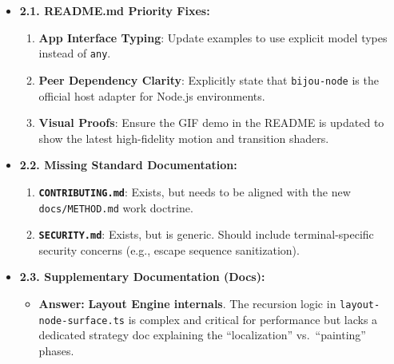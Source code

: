 \begin{itemize}
\tightlist
\item
  \textbf{2.1. README.md Priority Fixes:}

  \begin{enumerate}
  \def\labelenumi{\arabic{enumi}.}
  \tightlist
  \item
    \textbf{App Interface Typing}: Update examples to use explicit model types instead of \texttt{a\allowbreak{}n\allowbreak{}y}.
  \item
    \textbf{Peer Dependency Clarity}: Explicitly state that \texttt{b\allowbreak{}i\allowbreak{}j\allowbreak{}o\allowbreak{}u\allowbreak{}-\allowbreak{}n\allowbreak{}o\allowbreak{}d\allowbreak{}e} is the official host adapter for Node.js environments.
  \item
    \textbf{Visual Proofs}: Ensure the GIF demo in the README is updated to show the latest high-fidelity motion and transition shaders.
  \end{enumerate}
\item
  \textbf{2.2. Missing Standard Documentation:}

  \begin{enumerate}
  \def\labelenumi{\arabic{enumi}.}
  \tightlist
  \item
    \textbf{\texttt{C\allowbreak{}O\allowbreak{}N\allowbreak{}T\allowbreak{}R\allowbreak{}I\allowbreak{}B\allowbreak{}U\allowbreak{}T\allowbreak{}I\allowbreak{}N\allowbreak{}G\allowbreak{}.\allowbreak{}m\allowbreak{}d}}: Exists, but needs to be aligned with the new \texttt{d\allowbreak{}o\allowbreak{}c\allowbreak{}s\allowbreak{}/\allowbreak{}M\allowbreak{}E\allowbreak{}T\allowbreak{}H\allowbreak{}O\allowbreak{}D\allowbreak{}.\allowbreak{}m\allowbreak{}d} work doctrine.
  \item
    \textbf{\texttt{S\allowbreak{}E\allowbreak{}C\allowbreak{}U\allowbreak{}R\allowbreak{}I\allowbreak{}T\allowbreak{}Y\allowbreak{}.\allowbreak{}m\allowbreak{}d}}: Exists, but is generic. Should include terminal-specific security concerns (e.g., escape sequence sanitization).
  \end{enumerate}
\item
  \textbf{2.3. Supplementary Documentation (Docs):}

  \begin{itemize}
  \tightlist
  \item
    \textbf{Answer:} \textbf{Layout Engine internals}. The recursion logic in \texttt{l\allowbreak{}a\allowbreak{}y\allowbreak{}o\allowbreak{}u\allowbreak{}t\allowbreak{}-\allowbreak{}n\allowbreak{}o\allowbreak{}d\allowbreak{}e\allowbreak{}-\allowbreak{}s\allowbreak{}u\allowbreak{}r\allowbreak{}f\allowbreak{}a\allowbreak{}c\allowbreak{}e\allowbreak{}.\allowbreak{}t\allowbreak{}s} is complex and critical for performance but lacks a dedicated strategy doc explaining the ``localization'' vs.~``painting'' phases.
  \end{itemize}
\end{itemize}


